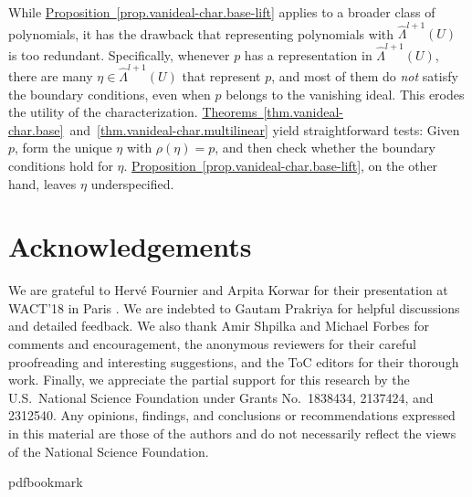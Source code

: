 \documentclass[11pt]{article}
\numberwithin{equation}{section}
\theoremstyle{definition}
\theoremstyle{plain}
\newcommand{\expref}[2]{\hyperref[#2]{#1~\ref{#2}}}
\newcommand{\exterior}{\ensuremath{\Lambda}}
\newcommand{\SimplicesBase}{\exterior}
\newcommand{\SpanVertices}{\ensuremath{U}}
\newcommand{\ExtSimplicesparam}[1]{\widehat{\SimplicesBase}^{#1}(\SpanVertices)}
\begin{document}
While \expref{Proposition}{prop.vanideal-char.base-lift} applies to a broader class of
polynomials,
it has the drawback that representing polynomials with
\(\ExtSimplicesparam{l+1}\) is too redundant.
Specifically,
whenever \(p\) has a representation in \(\ExtSimplicesparam{l+1}\),
there are many \(\eta\in\ExtSimplicesparam{l+1}\) that represent \(p\),
and most of them do \emph{not} satisfy the boundary conditions,
even when \(p\) belongs to the vanishing ideal.
This erodes the utility of the characterization.
\expref{Theorems}{thm.vanideal-char.base}~and~\ref{thm.vanideal-char.multilinear} yield
straightforward tests:
Given \(p\),
form the unique \(\eta\) with \(\rho(\eta)=p\),
and then check whether the boundary conditions hold for \(\eta\).
\expref{Proposition}{prop.vanideal-char.base-lift}, on the other hand, leaves \(\eta\) underspecified.

\section*{Acknowledgements}
We are grateful to Herv\'{e} Fournier and Arpita Korwar for their presentation at WACT'18 in Paris \cite{FournierKorwar2018}. 
We are indebted to Gautam Prakriya for helpful discussions and detailed feedback. 
We also thank Amir Shpilka and Michael Forbes for comments and encouragement, the anonymous reviewers for their careful proofreading and interesting suggestions, and the ToC editors for their thorough work.  
%
Finally, we appreciate the partial support for this research by the U.S.\ National Science Foundation under Grants No.\ 1838434, 2137424, and 2312540. Any opinions, findings, and conclusions or recommendations expressed in this material are those of the authors and do not necessarily reflect the views of the National Science Foundation.

%
%

%
%
%


\newcommand{\prelim}{Preliminary version in\ }\newcommand{\prelims}{Preliminary
  versions in\ }
\providecommand{\bibhead}[1]{}
\expandafter\ifx\csname pdfbookmark\endcsname\relax%
  \providecommand{\tocrefpdfbookmark}{}
\else\providecommand{\tocrefpdfbookmark}{%
   \hypertarget{tocreferences}{}%
   \pdfbookmark[1]{References}{tocreferences}}%
\fi
\end{document}
